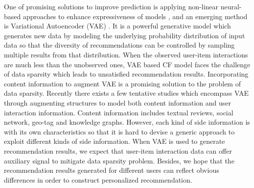 One of promising solutions to improve prediction is applying non-linear neural-based approaches to enhance expressiveness of models \cite{DBLP:conf/www/HeLZNHC17, DBLP:conf/wsdm/WuDZE16}, and an emerging method is Variational Autoencoder (VAE) \cite{DBLP:journals/corr/KingmaW13, DBLP:conf/www/LiangKHJ18,DBLP:conf/wsdm/WuDZE16}. It is a powerful generative model which generates new data by modeling the underlying probability distribution of input data so that the diversity of recommendations can be controlled by sampling multiple results from that distribution. 
When the observed user-item interactions are much less than the unobserved ones, VAE based CF model faces the challenge of data sparsity which leads to unsatisfied recommendation results.
Incorporating content information to augment VAE is a promising solution to the problem of data sparsity.  Recently there exists a few tentative studies \cite{DBLP:journals/corr/abs-1808-01006,DBLP:conf/cikm/LeeSM17, DBLP:conf/pakdd/PangYW19, DBLP:conf/wsdm/RakeshWSL19, DBLP:conf/ictir/WuMO20, DBLP:conf/recsys/ZhangZHC20} which encompass VAE through augmenting structures to model both content information and user interaction information. Content information includes textual reviews, social network, geo-tag and knowledge graphs. However, each kind of side information is with its own characteristics so that it is hard to devise a generic approach to exploit different kinds of side information. 
When VAE is used to generate recommendation results, we expect that user-item interaction data can offer auxiliary signal to mitigate data sparsity problem. Besides, we hope that the recommendation results generated for different users can reflect obvious differences in order to construct personalized recommendation.

